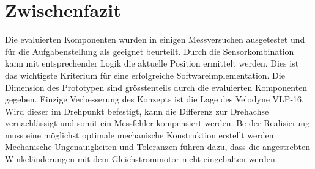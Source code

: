 \section{Zwischenfazit}
\label{ZwischenfazitKonz}
Die evaluierten Komponenten wurden in einigen Messversuchen ausgetestet und für die Aufgabenstellung als geeignet beurteilt. Durch die Sensorkombination kann mit entsprechender Logik die aktuelle Position ermittelt werden. Dies ist das wichtigste Kriterium für eine erfolgreiche Softwareimplementation. Die Dimension des Prototypen sind grösstenteils durch die evaluierten Komponenten gegeben. Einzige Verbesserung des Konzepts ist die Lage des Velodyne VLP-16. Wird dieser im Drehpunkt befestigt, kann die Differenz zur Drehachse vernachlässigt und somit ein Messfehler kompensiert werden. Be der Realisierung muss eine möglichst optimale mechanische Konstruktion erstellt werden. Mechanische Ungenauigkeiten und Toleranzen führen dazu, dass die angestrebten Winkeländerungen mit dem Gleichstrommotor nicht eingehalten werden.



